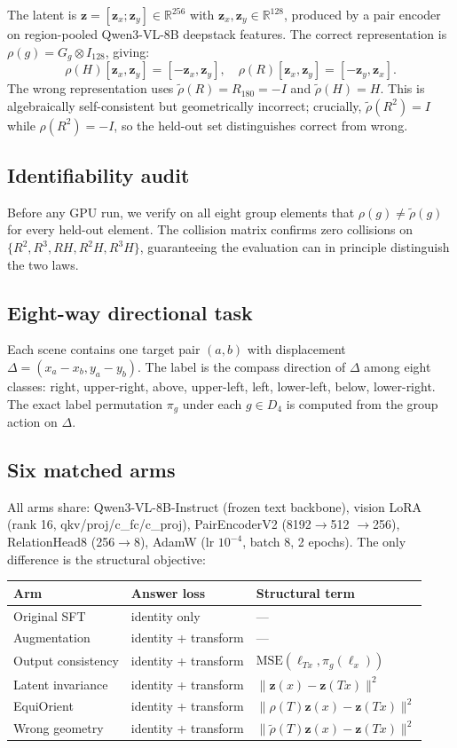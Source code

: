 \documentclass[10pt,twocolumn,letterpaper]{article}
\newcommand{\rhoop}{\rho}
\newcommand{\zblk}{\mathbf{z}}
\newcommand{\R}{\mathbb{R}}
\begin{document}
The latent is $\zblk = [\zblk_x; \zblk_y] \in \R^{256}$ with
$\zblk_x, \zblk_y \in \R^{128}$, produced by a pair encoder on
region-pooled Qwen3-VL-8B deepstack features. The correct representation
is $\rhoop(g) = G_g \otimes I_{128}$, giving:
\[
\rhoop(H)[\zblk_x, \zblk_y] = [-\zblk_x, \zblk_y], \quad
\rhoop(R)[\zblk_x, \zblk_y] = [-\zblk_y, \zblk_x].
\]
The wrong representation uses $\tilde{\rhoop}(R) = R_{180} = -I$ and
$\tilde{\rhoop}(H) = H$. This is algebraically self-consistent but
geometrically incorrect; crucially, $\tilde{\rhoop}(R^2) = I$ while
$\rhoop(R^2) = -I$, so the held-out set distinguishes correct from
wrong.

\subsection{Identifiability audit}

Before any GPU run, we verify on all eight group elements that
$\rhoop(g) \neq \tilde{\rhoop}(g)$ for every held-out element. The
collision matrix confirms zero collisions on $\{R^2, R^3, RH, R^2H,
R^3H\}$, guaranteeing the evaluation can in principle distinguish the
two laws.

\subsection{Eight-way directional task}

Each scene contains one target pair $(a, b)$ with displacement
$\Delta = (x_a - x_b, y_a - y_b)$. The label is the compass direction
of $\Delta$ among eight classes: right, upper-right, above, upper-left,
left, lower-left, below, lower-right. The exact label permutation
$\pi_g$ under each $g \in D_4$ is computed from the group action on
$\Delta$.

\subsection{Six matched arms}

All arms share: Qwen3-VL-8B-Instruct (frozen text backbone), vision
LoRA (rank 16, qkv/proj/c\_fc/c\_proj), PairEncoderV2 (8192$\to$512
$\to$256), RelationHead8 (256$\to$8), AdamW (lr $10^{-4}$, batch 8,
2 epochs). The only difference is the structural objective:

\begin{tabular}{lll}
\toprule
Arm & Answer loss & Structural term \\
\midrule
Original SFT & identity only & --- \\
Augmentation & identity + transform & --- \\
Output consistency & identity + transform & $\text{MSE}(\ell_{Tx}, \pi_g(\ell_x))$ \\
Latent invariance & identity + transform & $\|\zblk(x) - \zblk(Tx)\|^2$ \\
EquiOrient & identity + transform & $\|\rhoop(T)\zblk(x) - \zblk(Tx)\|^2$ \\
Wrong geometry & identity + transform & $\|\tilde{\rhoop}(T)\zblk(x) - \zblk(Tx)\|^2$ \\
\bottomrule
\end{tabular}
\end{document}
